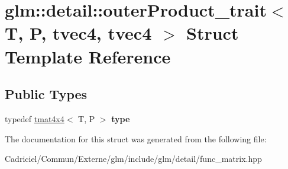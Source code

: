\hypertarget{structglm_1_1detail_1_1outer_product__trait_3_01_t_00_01_p_00_01tvec4_00_01tvec4_01_4}{}\section{glm\+:\+:detail\+:\+:outer\+Product\+\_\+trait$<$ T, P, tvec4, tvec4 $>$ Struct Template Reference}
\label{structglm_1_1detail_1_1outer_product__trait_3_01_t_00_01_p_00_01tvec4_00_01tvec4_01_4}
\subsection*{Public Types}
\begin{DoxyCompactItemize}
\item 
typedef \hyperlink{structglm_1_1detail_1_1tmat4x4}{tmat4x4}$<$ T, P $>$ {\bfseries type}\hypertarget{structglm_1_1detail_1_1outer_product__trait_3_01_t_00_01_p_00_01tvec4_00_01tvec4_01_4_a89f0d2b33be6604293d1373176291811}{}\label{structglm_1_1detail_1_1outer_product__trait_3_01_t_00_01_p_00_01tvec4_00_01tvec4_01_4_a89f0d2b33be6604293d1373176291811}

\end{DoxyCompactItemize}


The documentation for this struct was generated from the following file\+:\begin{DoxyCompactItemize}
\item 
Cadriciel/\+Commun/\+Externe/glm/include/glm/detail/func\+\_\+matrix.\+hpp\end{DoxyCompactItemize}
